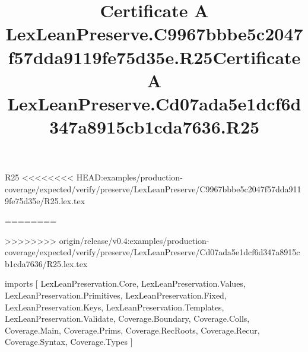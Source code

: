 \begin{lexlean}{R25}
<<<<<<<< HEAD:examples/production-coverage/expected/verify/preserve/LexLeanPreserve/C9967bbbe5c2047f57dda9119fe75d35e/R25.lex.tex
\title{Certificate A LexLeanPreserve.C9967bbbe5c2047f57dda9119fe75d35e.R25}
========
\title{Certificate A LexLeanPreserve.Cd07ada5e1dcf6d347a8915cb1cda7636.R25}
>>>>>>>> origin/release/v0.4:examples/production-coverage/expected/verify/preserve/LexLeanPreserve/Cd07ada5e1dcf6d347a8915cb1cda7636/R25.lex.tex
\begin{coremodule}
imports [
  LexLeanPreservation.Core,
  LexLeanPreservation.Values,
  LexLeanPreservation.Primitives,
  LexLeanPreservation.Fixed,
  LexLeanPreservation.Keys,
  LexLeanPreservation.Templates,
  LexLeanPreservation.Validate,
  Coverage.Boundary,
  Coverage.Colls,
  Coverage.Main,
  Coverage.Prims,
  Coverage.RecRoots,
  Coverage.Recur,
  Coverage.Syntax,
  Coverage.Types
]


\end{coremodule}
\end{lexlean}
